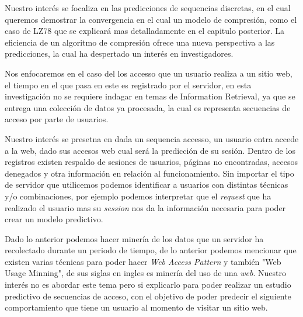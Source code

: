 Nuestro interés se focaliza en las predicciones de sequencias discretas, en el cual queremos demostrar la convergencia en el cual un modelo de compresión, como el caso de LZ78 que se explicará mas detalladamente en el capitulo posterior. La eficiencia de un algoritmo de compresión ofrece una nueva perspectiva a las predicciones, la cual ha despertado un interés en investigadores.

Nos enfocaremos en el caso del los accesso que un usuario realiza a un sitio web, el tiempo en el que pasa en este es registrado por el servidor, en esta investigación no se requiere indagar en temas de Information Retrieval, ya que se entrega una colección de datos ya procesada, la cual es representa secuencias de acceso por parte de usuarios.




Nuestro interés se presetna en dada un sequencia accesso, un usuario entra accede a la web, dado sus accesos web cual será la predicción de su sesión.  Dentro de los registros existen respaldo de sesiones de usuarios, páginas no encontradas, accesos denegados y otra información en relación al funcionamiento. Sin importar el tipo de servidor que utilicemos podemos identificar a usuarios con distintas técnicas y/o combinaciones, por ejemplo podemos interpretar que el \emph{request} que ha realizado el usuario mas su \emph{session} nos da la información necesaria para poder crear un modelo predictivo.

Dado lo anterior podemos hacer minería de los datos que un servidor ha recolectado durante un periodo de tiempo, de lo anterior  podemos mencionar que existen varias técnicas para poder hacer \emph{Web Access Pattern } y también  "Web Usage Minning", de sus siglas en ingles es minería del uso de una \emph{web}. Nuestro interés no es abordar este tema pero si explicarlo para poder realizar un estudio predictivo de secuencias de acceso, con el objetivo de poder predecir el siguiente comportamiento que tiene un usuario al momento de visitar un sitio web.







